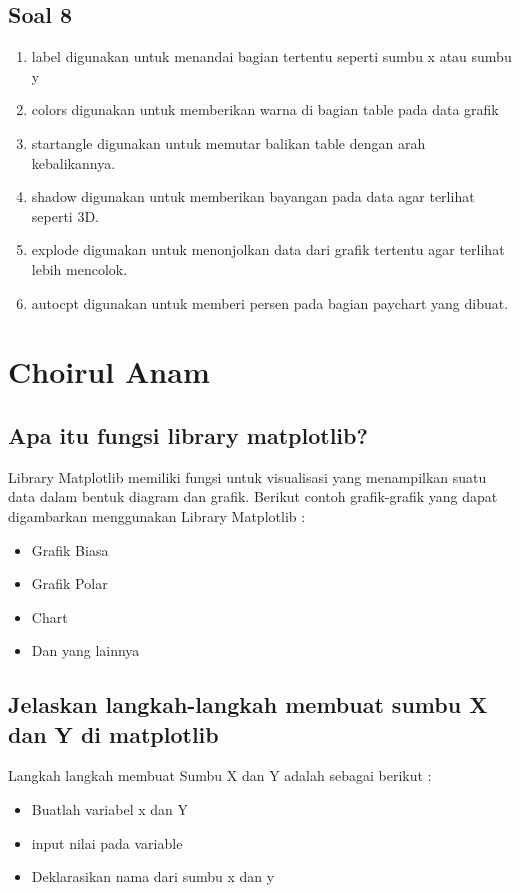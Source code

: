 \subsection{Soal 8}
\begin{enumerate}
\item label digunakan untuk menandai bagian tertentu seperti sumbu x atau sumbu y
\item colors digunakan untuk memberikan warna di bagian table pada data grafik
\item startangle digunakan untuk memutar balikan table dengan arah kebalikannya.
\item shadow digunakan untuk memberikan bayangan pada data agar terlihat seperti 3D.
\item explode digunakan untuk menonjolkan data dari grafik tertentu agar terlihat lebih mencolok.
\item autocpt digunakan untuk memberi persen pada bagian paychart yang dibuat.
\end{enumerate}

\section{Choirul Anam}
\subsection{Apa itu fungsi library matplotlib?}
Library Matplotlib memiliki fungsi untuk visualisasi yang menampilkan suatu data dalam bentuk diagram dan grafik. 
Berikut contoh grafik-grafik yang dapat digambarkan menggunakan Library Matplotlib :
\begin{itemize}
    \item Grafik Biasa 
    \item Grafik Polar
    \item Chart
    \item Dan yang lainnya
\end{itemize}

\subsection{Jelaskan langkah-langkah membuat sumbu X dan Y di matplotlib}
Langkah langkah membuat Sumbu X dan Y adalah sebagai berikut :
\begin{itemize}
    \item Buatlah variabel x dan Y
    \item input nilai pada variable
    
    \item Deklarasikan nama dari sumbu x dan y 
    
\end{itemize}

